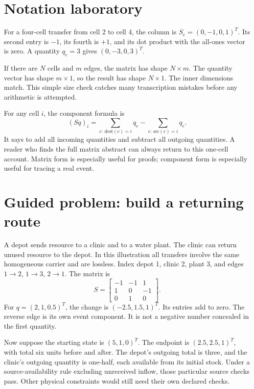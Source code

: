 \section{Notation laboratory}
For a four-cell transfer from cell 2 to cell 4, the column is \(S_e=(0,-1,0,1)^T\). Its second entry is \(-1\), its fourth is \(+1\), and its dot product with the all-ones vector is zero. A quantity \(q_e=3\) gives \((0,-3,0,3)^T\).

If there are \(N\) cells and \(m\) edges, the matrix has shape \(N\times m\). The quantity vector has shape \(m\times1\), so the result has shape \(N\times1\). The inner dimensions match. This simple size check catches many transcription mistakes before any arithmetic is attempted.

For any cell \(i\), the component formula is
\begin{equation}
 (Sq)_i=\sum_{e:\,\mathrm{dest}(e)=i}q_e
       -\sum_{e:\,\mathrm{src}(e)=i}q_e.
\end{equation}
It says to add all incoming quantities and subtract all outgoing quantities. A reader who finds the full matrix abstract can always return to this one-cell account. Matrix form is especially useful for proofs; component form is especially useful for tracing a real event.

\section{Guided problem: build a returning route}
A depot sends resource to a clinic and to a water plant. The clinic can return unused resource to the depot. In this illustration all transfers involve the same homogeneous carrier and are lossless. Index depot 1, clinic 2, plant 3, and edges \(1\to2\), \(1\to3\), \(2\to1\). The matrix is
\begin{equation}
 S=\begin{bmatrix}-1&-1&1\\1&0&-1\\0&1&0\end{bmatrix}.
\end{equation}
For \(q=(2,1,0.5)^T\), the change is \((-2.5,1.5,1)^T\). Its entries add to zero. The reverse edge is its own event component. It is not a negative number concealed in the first quantity.

Now suppose the starting state is \((5,1,0)^T\). The endpoint is \((2.5,2.5,1)^T\), with total six units before and after. The depot's outgoing total is three, and the clinic's outgoing quantity is one-half, each available from its initial stock. Under a source-availability rule excluding unreceived inflow, those particular source checks pass. Other physical constraints would still need their own declared checks.

